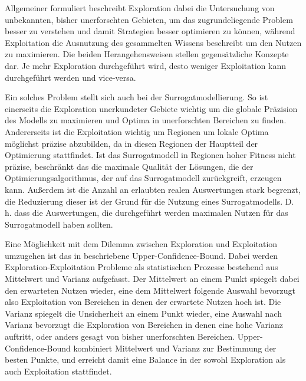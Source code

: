 Allgemeiner formuliert beschreibt Exploration dabei die Untersuchung von unbekannten, bisher unerforschten Gebieten, um das zugrundeliegende Problem besser zu verstehen und damit Strategien besser optimieren zu können, während Exploitation die Ausnutzung des gesammelten Wissens beschreibt um den Nutzen zu maximieren.
Die beiden Herangehensweisen stellen gegensätzliche Konzepte dar.
Je mehr Exploration durchgeführt wird, desto weniger Exploitation kann durchgeführt werden und vice-versa.

Ein solches Problem stellt sich auch bei der Surrogatmodellierung.
So ist einerseits die Exploration unerkundeter Gebiete wichtig um die globale Präzision des Modells zu maximieren und Optima in unerforschten Bereichen zu finden.
Andererseits ist die Exploitation wichtig um Regionen um lokale Optima möglichst präzise abzubilden, da in diesen Regionen der Hauptteil der Optimierung stattfindet.
Ist das Surrogatmodell in Regionen hoher Fitness nicht präzise, beschränkt das die maximale Qualität der Lösungen, die der Optimierungsalgorithmus, der auf das Surrogatmodell zurückgreift, erzeugen kann.
Außerdem ist die Anzahl an erlaubten realen Auswertungen stark begrenzt, die Reduzierung dieser ist der Grund für die Nutzung eines Surrogatmodells.
D. h. dass die Auswertungen, die durchgeführt werden maximalen Nutzen für das Surrogatmodell haben sollten.

Eine Möglichkeit mit dem Dilemma zwischen Exploration und Exploitation umzugehen ist das in \cite{Auer.2002} beschriebene Upper-Confidence-Bound. Dabei werden Exploration-Exploitation Probleme als statistischen Prozesse bestehend aus Mittelwert und Varianz aufgefasst.
Der Mittelwert an einem Punkt spiegelt dabei den erwarteten Nutzen wieder, eine dem Mittelwert folgende Auswahl bevorzugt also Exploitation von Bereichen in denen der erwartete Nutzen hoch ist.
Die Varianz spiegelt die Unsicherheit an einem Punkt wieder, eine Auswahl nach Varianz bevorzugt die Exploration von Bereichen in denen eine hohe Varianz auftritt, oder anders gesagt von bisher unerforschten Bereichen.
Upper-Confidence-Bound kombiniert Mittelwert und Varianz zur Bestimmung der besten Punkte, und erreicht damit eine Balance in der sowohl Exploration als auch Exploitation stattfindet.

